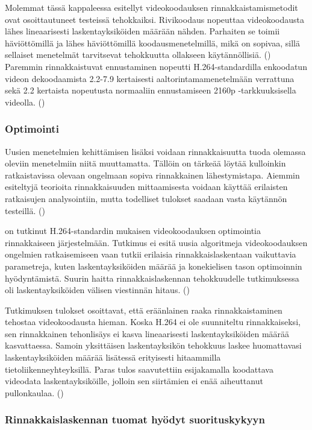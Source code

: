 Molemmat tässä kappaleessa esitellyt videokoodauksen rinnakkaistamismetodit
ovat osoittautuneet testeissä tehokkaiksi. Rivikoodaus nopeuttaa videokoodausta
lähes lineaarisesti laskentayksiköiden määrään nähden. Parhaiten se toimii
häviöttömillä ja lähes häviöttömillä koodausmenetelmillä, mikä on sopivaa,
sillä sellaiset menetelmät tarvitsevat tehokkuutta ollakseen käytännöllisiä.
(\citealt{xu}) Paremmin rinnakkaistuvat ennustaminen nopeutti H.264-standardilla
enkoodatun videon dekoodaamista 2.2-7.9 kertaisesti aaltorintamamenetelmään
verrattuna sekä 2.2 kertaista nopeutusta normaaliin ennustamiseen 2160p
-tarkkuuksisella videolla. (\citealt{pieters})

\subsubsection{Optimointi}

Uusien menetelmien kehittämisen lisäksi voidaan rinnakkaisuutta tuoda
olemassa oleviin menetelmiin niitä muuttamatta. Tällöin on tärkeää löytää
kulloinkin ratkaistavissa olevaan ongelmaan sopiva rinnakkainen lähestymistapa.
Aiemmin esiteltyjä teorioita rinnakkaisuuden mittaamisesta voidaan käyttää
erilaisten ratkaisujen analysointiin, mutta todelliset tulokset saadaan
vasta käytännön testeillä. (\cite{li})

\citealt{li} on tutkinut H.264-standardin mukaisen videokoodauksen optimointia
rinnakkaiseen järjestelmään. Tutkimus ei esitä uusia algoritmeja
videokoodauksen ongelmien ratkaisemiseen vaan tutkii erilaisia
rinnakkaislaskentaan vaikuttavia parametreja, kuten laskentayksiköiden määrää
ja konekielisen tason optimoinnin hyödyntämistä. Suurin haitta
rinnakkaislaskennan tehokkuudelle tutkimuksessa oli laskentayksiköiden välisen
viestinnän hitaus. (\citealt{li})

Tutkimuksen tulokset osoittavat, että eräänlainen raaka rinnakkaistaminen
tehostaa videokoodausta hieman. Koska H.264 ei ole suunniteltu rinnakkaiseksi,
sen rinnakkainen tehonlisäys ei kasva lineaarisesti laskentayksiköiden määrää
kasvattaessa. Samoin yksittäisen laskentayksikön tehokkuus laskee huomattavasi
laskentayksiköiden määrää lisätessä erityisesti hitaammilla
tietoliikenneyhteyksillä. Paras tulos saavutettiin esijakamalla koodattava
videodata laskentayksiköille, jolloin sen siirtämien ei enää aiheuttanut
pullonkaulaa. (\citealt{li})

\subsubsection{Rinnakkaislaskennan tuomat hyödyt suorituskykyyn}

